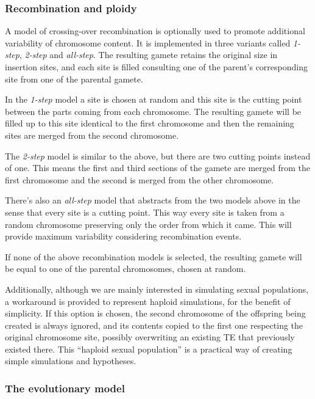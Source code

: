 \documentclass[10pt]{article}
\begin{document}
\subsubsection{Recombination and ploidy}

A model of crossing-over recombination is optionally used to promote
additional variability of chromosome content. It is implemented in
three variants called \emph{1-step}, \emph{2-step} and
\emph{all-step}. The resulting gamete retains the original size in
insertion sites, and each site is filled consulting one of the
parent's corresponding site from one of the parental gamete.

In the \emph{1-step} model a site is chosen at random and this site is
the cutting point between the parts coming from each chromosome. The
resulting gamete will be filled up to this site identical to the first
chromosome and then the remaining sites are merged from the second
chromosome.

The \emph{2-step} model is similar to the above, but there are two
cutting points instead of one. This means the first and third sections
of the gamete are merged from the first chromosome and the second is
merged from the other chromosome.

There's also an \emph{all-step} model that abstracts from the two
models above in the sense that every site is a cutting point. This way
every site is taken from a random chromosome preserving only the order
from which it came. This will provide maximum variability considering
recombination events.

If none of the above recombination models is selected, the resulting
gamete will be equal to one of the parental chromosomes, chosen at
random.

Additionally, although we are mainly interested in simulating sexual
populations, a workaround is provided to represent haploid
simulations, for the benefit of simplicity. If this option is chosen,
the second chromosome of the offspring being created is always
ignored, and its contents copied to the first one respecting the
original chromosome site, possibly overwriting an existing TE that
previously existed there. This ``haploid sexual population'' is a
practical way of creating simple simulations and hypotheses.

\subsubsection{The evolutionary model}
\end{document}
